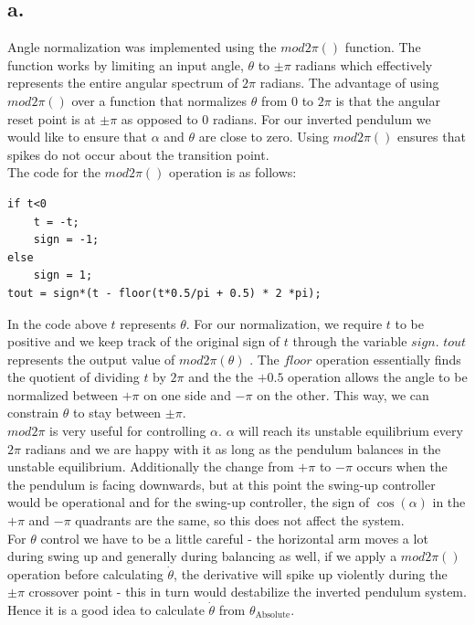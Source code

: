 \documentclass{article}
\theoremstyle{plain}
\theoremstyle{definition}
\theoremstyle{remark}
\begin{document}
\subsection*{a.}
Angle normalization was implemented using the $mod2\pi()$ function. The function works by limiting an input angle, $\theta$ to $\pm \pi $ radians which effectively represents the entire angular spectrum of $2\pi$ radians. The advantage of using $mod2\pi()$ over a function that normalizes $\theta$ from $0$ to $2\pi$ is that the angular reset point is at $\pm \pi$ as opposed to $0$ radians. For our inverted pendulum we would like to ensure that $\alpha$ and $\theta$ are close to zero. Using $mod2\pi()$ ensures that spikes do not occur about the transition point.\\

The code for the $mod2\pi()$ operation is as follows:

\begin{verbatim}
if t<0
    t = -t;
    sign = -1;
else
    sign = 1;
tout = sign*(t - floor(t*0.5/pi + 0.5) * 2 *pi);
\end{verbatim}

In the code above $t$ represents $\theta$. For our normalization, we require $t$ to be positive and we keep track of the original sign of $t$ through the variable $sign$. $tout$ represents the output value of $mod2\pi(\theta)$ . The $floor$ operation essentially finds the quotient of dividing $t$ by $2\pi$ and the the $+ 0.5$ operation allows the angle to be normalized between $+\pi$ on one side and $-\pi$ on the other. This way, we can constrain $\theta$ to stay between $\pm \pi$.\\

$mod2\pi$ is very useful for controlling $\alpha$. $\alpha$ will reach its unstable equilibrium every $2\pi$ radians and we are happy with it as long as the pendulum balances in the unstable equilibrium. Additionally the change from $+\pi$ to $-\pi$ occurs when the the pendulum is facing downwards, but at this point the swing-up controller would be operational and for the swing-up controller, the sign of $\cos(\alpha)$ in the $+\pi$ and $-\pi$ quadrants are the same, so this does not affect the system.\\

For $\theta$ control we have to be a little careful - the horizontal arm moves a lot during swing up and generally during balancing as well, if we apply a $mod2\pi()$ operation before calculating $\dot{\theta}$, the derivative will spike up violently during the $\pm \pi$ crossover point - this in turn would destabilize the inverted pendulum system. Hence it is a good idea to calculate $\dot{\theta}$ from $\theta_{\text{Absolute}}$.\\
\end{document}
